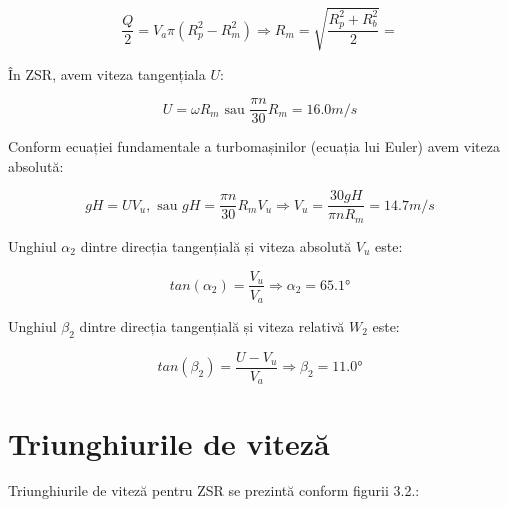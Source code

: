 \begin{equation}
\frac{Q}{2} = V_a \pi (R_p^2 - R_m^2) \Rightarrow{} R_m = \sqrt{\frac{R_p^2 + R_b^2}{2}} = 
\end{equation}

În ZSR, avem viteza tangențiala $U$:

\begin{equation}
U=\omega R_m \text{ sau } \frac{\pi n}{30} R_m=16.0\si{m/s}
\end{equation}

Conform ecuației fundamentale a turbomașinilor (ecuația lui Euler) avem viteza absolută:

\begin{equation}
gH=UV_{u}, \text{ sau } gH=\frac{\pi n}{30} R_m V_{u} \Rightarrow V_{u} = \frac{30gH}{\pi n R_m} = 14.7\si{m/s}
\end{equation}


Unghiul $\alpha_2$ dintre direcția tangențială și viteza absolută $V_u$ este:

\begin{equation}
tan(\alpha_{2 })=\frac{V_{u}}{V_{a}} \Rightarrow \alpha_{2}=65.1\si{\degree}
\end{equation}



Unghiul $\beta_2$ dintre direcția tangențială și viteza relativă $W_2$ este:

\begin{equation}
tan(\beta_{2})=\frac{U - V_u}{V_a} \Rightarrow \beta_{2} =11.0\si{\degree}
\end{equation}


\section{Triunghiurile de viteză}

Triunghiurile de viteză pentru ZSR se prezintă conform figurii 3.2.:


